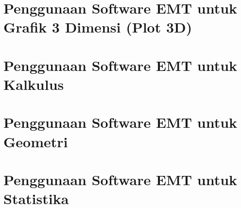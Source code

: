 \documentclass{report}
\begin{document}
\newpage
\chapter{\Large Penggunaan Software EMT untuk Grafik 3 Dimensi (Plot 3D)}


\newpage
\chapter{\Large Penggunaan Software EMT untuk Kalkulus}


\newpage
\chapter{\Large Penggunaan Software EMT untuk Geometri}


\newpage
\chapter{\Large Penggunaan Software EMT untuk Statistika}

\end{document}
